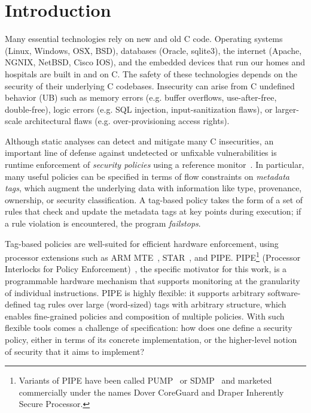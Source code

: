 \documentclass{report}
\begin{document}
\chapter{Introduction}

Many essential technologies rely on new and old C code. Operating systems (Linux, Windows, OSX, BSD),
databases (Oracle, sqlite3), the internet (Apache, NGNIX, NetBSD, Cisco IOS), and the 
embedded devices that run our homes and hospitals are built in and on C.
The safety of these technologies depends on the security of their underlying C codebases.
Insecurity can arise from C undefined behavior (UB) such as memory errors
(e.g. buffer overflows, use-after-free, double-free), logic errors
(e.g. SQL injection, input-sanitization flaws), or larger-scale architectural flaws
(e.g. over-provisioning access rights).

Although static analyses can detect and mitigate many C insecurities, an important line of
defense against undetected or unfixable vulnerabilities is runtime enforcement of
{\em security policies} using a reference monitor~\cite{Anderson72:PlanningStudy}. In particular, 
many useful policies can be specified in terms of flow constraints on 
\emph{metadata tags}, which augment the underlying data with information like type, provenance,
ownership, or security classification. A tag-based policy takes the form of a set of
rules that check and update the metadata tags at key points during execution; if a rule violation is
encountered, the program \emph{failstops}.

Tag-based policies are well-suited for efficient hardware enforcement, using 
processor extensions such as ARM MTE~\cite{arm-mte},
STAR~\cite{Gollapudi+23}, and
PIPE.  PIPE\footnote{ Variants of PIPE have
been called PUMP~\cite{Dhawan+15} or %
SDMP~\cite{RoesslerD18}%
and marketed commercially under the names Dover CoreGuard and Draper Inherently Secure Processor.}
(Processor Interlocks for Policy Enforcement)~\cite{Azevedo+16,Azevedo+15},%
the specific motivator for this work, is a programmable hardware mechanism that supports monitoring 
at the granularity of individual instructions. PIPE is highly flexible: it supports
arbitrary software-defined tag rules over large (word-sized) tags with arbitrary structure,
which enables fine-grained policies and composition of multiple policies.
With such flexible tools comes a challenge of specification: how does one define a security policy,
either in terms of its concrete implementation, or the higher-level notion of security that it
aims to implement?
\end{document}
